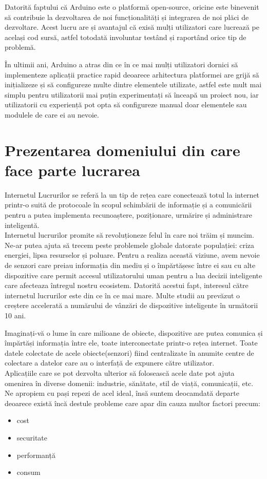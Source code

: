 \documentclass[12pt,a4paper]{report}
\begin{document}
Datorită faptului că Arduino este o platformă open-source, oricine este binevenit să contribuie la dezvoltarea de noi funcționalități și integrarea de noi plăci de dezvoltare. Acest lucru are și avantajul că exisă mulți utilizatori care lucrează pe același cod sursă, astfel totodată involuntar testând și raportând orice tip de problemă.

În ultimii ani, Arduino a atras din ce în ce mai mulți utilizatori dornici să implementeze aplicații practice rapid deoarece arhitectura platformei are grijă să inițializeze și să configureze multe dintre elementele utilizate, astfel este mult mai simplu pentru utilizatorii mai puțin experimentați să înceapă un proiect nou, iar utilizatorii cu experiență pot opta să configureze manual doar elementele sau modulele de care ei au nevoie. 


\chapter{Prezentarea domeniului din care face parte lucrarea}
Internetul Lucrurilor se referă la un tip de rețea care conectează totul la internet printr-o suită de protocoale în scopul schimbării de  informație și a comunicării pentru a putea implementa recunoaștere, poziționare, urmărire și administrare inteligentă\cite{theiot}. \\
Internetul lucrurilor promite să revoluționeze felul în care noi trăim și muncim. Ne-ar putea ajuta să trecem peste problemele globale datorate populației: criza energiei, lipsa resurselor și poluare. Pentru a realiza această viziune, avem nevoie de senzori care preiau informația din mediu și o împărtășesc între ei sau cu alte dispozitive care permit accesul utilizatorului uman pentru a lua decizii inteligente care afecteaza întregul nostru ecosistem.
Datorită acestui fapt, interesul către internetul lucrurilor este din ce în ce mai mare. Multe studii au prevăzut o creștere accelerată a numărului de vânzări de dispozitive inteligente în următorii 10 ani.

Imaginați-vă o lume în care milioane de obiecte, dispozitive are putea comunica și împărtăși informația între ele, toate interconectate printr-o rețea internet. Toate datele colectate de acele obiecte(senzori) fiind centralizate în anumite centre de colectare a datelor care au o interfață de expunere către utilizator. \\
Aplicațiile care se pot dezvolta ulterior să folosească acele date pot ajuta omenirea în diverse domenii: industrie, sănătate, stil de viață, comunicații, etc.
Ne apropiem cu pași repezi de acel ideal, însă suntem deocamdată departe deoarece există încă destule probleme care apar din cauza multor factori precum:
\begin{itemize}
	\item cost
	\item securitate
	\item performanță
	\item consum
\end{itemize}
\end{document}
